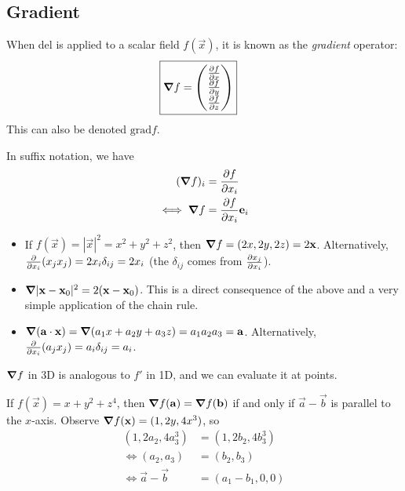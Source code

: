 \documentclass{../../template/note}
\begin{document}
    \subsection{Gradient}

    When del is applied to a scalar field \(f(\vec x)\), it is known as the \emph{gradient} operator:
    \begin{align*}
        \Aboxed{\grad f = \begin{pmatrix}
         \pd{f}{x} \\
         \pd{f}{y} \\
         \pd{f}{z} \\
        \end{pmatrix}}
    \end{align*}
    This can also be denoted \(\mathrm{grad} f\).
    
    In suffix notation, we have
    \begin{align*}
        (\grad f)_i &= \pd{f}{x_i} \\
        \iff \grad f &= \pd{f}{x_i} \vec e_i
    \end{align*}
    
    \begin{example*}
        \begin{itemize}
            \item If \(f(\vec x) = |\vec x|^2 = x^2 + y^2 + z^2\), then \(\grad f = (2x, 2y, 2z) = 2\vec x\). Alternatively, \(\pd{}{x_i}(x_jx_j) = 2x_i \delta_{ij} = 2x_i\) (the \(\delta_{ij}\) comes from \(\pd{x_j}{x_i}\)).
            \item \(\grad|\vec x - \vec x_0|^2 = 2(\vec x - \vec x_0)\). This is a direct consequence of the above and a very simple application of the chain rule.
            \item \(\grad(\vec a \cdot \vec x) = \grad(a_1x+a_2y+a_3z) = a_1a_2a_3 = \vec a\). Alternatively, \(\pd{}{x_i}(a_jx_j) = a_i\delta_{ij} = a_i\).
        \end{itemize}
    \end{example*}
    
    \(\grad f\) in 3D is analogous to \(f'\) in 1D, and we can evaluate it at points.

    \begin{example*}
        If \(f(\vec x) = x + y^2 + z^4\), then \(\grad f(\vec a) = \grad f(\vec b)\) if and only if \(\vec a - \vec b\) is parallel to the \(x\)-axis. Observe \(\grad f(\vec x) = (1, 2y, 4x^3)\), so
        \begin{align*}
            (1, 2a_2, 4a_3^3) &= (1, 2b_2, 4b_3^3) \\
            \iff (a_2, a_3) &= (b_2, b_3) \\
            \iff \vec a - \vec b &= (a_1 - b_1, 0, 0)
        \end{align*}
    \end{example*}
    
\end{document}
